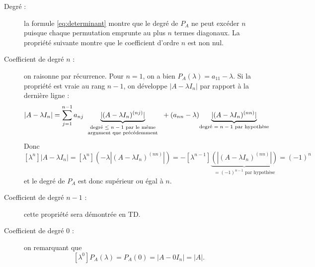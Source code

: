 \proof
\begin{description}
  \item[Degré :] la formule \eqref{eq:determinant} montre que le degré de $P_A$ ne peut excéder $n$ puisque chaque permutation emprunte au plus $n$ termes diagonaux. La propriété suivante montre que le coefficient d'ordre $n$ est non nul.
  \item[Coefficient de degré $n$ :] on raisonne par récurrence. Pour $n = 1$, on a bien $P_A(\lambda) = a_{11} - \lambda$. Si la propriété est vraie au rang $n-1$, on développe $|A - \lambda I_n|$ par rapport à la dernière ligne : 
  $$
  |A - \lambda I_n| 
  = \sum_{j=1}^{n-1} a_{nj} \underset{\scriptsize
    \begin{tabular}{c}\text{degré $\leq n-1$ par le même} \\
    \text{argument que précédemment}\end{tabular}
    }{\underbrace{|(A - \lambda I_n)^{(nj)}|}} + (a_{nn} - \lambda) \underset{\text{degré $= n-1$ par hypothèse}}{\underbrace{|(A - \lambda I_n)^{(nn)}|}}
  $$
  Donc
  $$
  [\lambda^n]|A - \lambda I_n| 
  = [\lambda^n](-\lambda |(A - \lambda I_n)^{(nn)}|) 
  = - [\lambda^{n-1}]\underset{\text{$= (-1)^{n-1}$ par hypothèse}}{\underbrace{(|(A - \lambda I_n)^{(nn)}|)}}
  = (-1)^n
  $$
  et le degré de $P_A$ est donc supérieur ou égal à $n$.
  \item[Coefficient de degré $n-1$ :] cette propriété sera démontrée en TD.
  \item[Coefficient de degré $0$ :] on remarquant que
    $$
    [\lambda^0]P_A(\lambda) = P_A(0) = |A - 0 I_n| = |A|.
    $$
\end{description}
